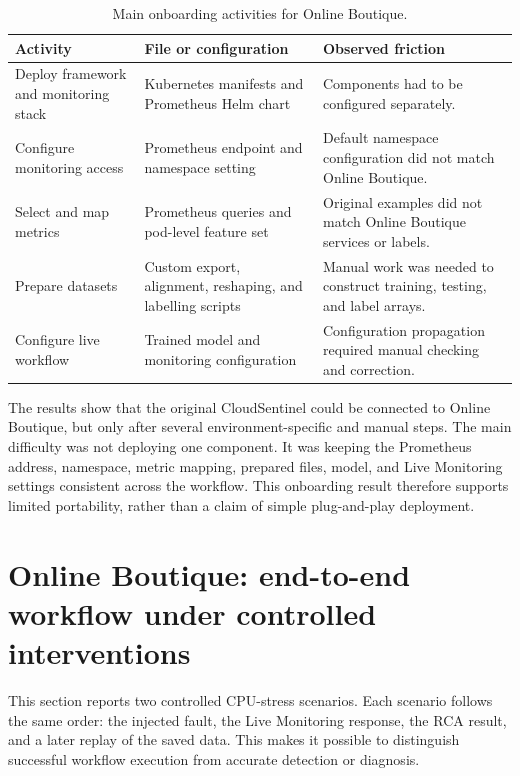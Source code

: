 \begin{table}[htbp]
    \centering
    \small
    \caption{Main onboarding activities for Online Boutique.}
    \label{tab:online_boutique_onboarding}
    \begin{tabular}{p{} p{} p{}}
        \toprule
        \textbf{Activity} & \textbf{File or configuration} & \textbf{Observed friction} \\
        \midrule
        Deploy framework and monitoring stack & Kubernetes manifests and Prometheus Helm chart & Components had to be configured separately. \\
        Configure monitoring access & Prometheus endpoint and namespace setting & Default namespace configuration did not match Online Boutique. \\
        Select and map metrics & Prometheus queries and pod-level feature set & Original examples did not match Online Boutique services or labels. \\
        Prepare datasets & Custom export, alignment, reshaping, and labelling scripts & Manual work was needed to construct training, testing, and label arrays. \\
        Configure live workflow & Trained model and monitoring configuration & Configuration propagation required manual checking and correction. \\
        \bottomrule
    \end{tabular}
\end{table}

The results show that the original CloudSentinel could be connected to Online Boutique, but only after several environment-specific and manual steps. The main difficulty was not deploying one component. It was keeping the Prometheus address, namespace, metric mapping, prepared files, model, and Live Monitoring settings consistent across the workflow. This onboarding result therefore supports limited portability, rather than a claim of simple plug-and-play deployment.

\section{Online Boutique: end-to-end workflow under controlled interventions}
This section reports two controlled CPU-stress scenarios. Each scenario follows the same order: the injected fault, the Live Monitoring response, the RCA result, and a later replay of the saved data. This makes it possible to distinguish successful workflow execution from accurate detection or diagnosis.

